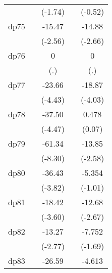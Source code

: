 {\begin{tabular}{l*{4}{c}}
            &                     &     (-1.74)         &                     &     (-0.52)         \\
[1em]
dp75        &                     &      -15.47\sym{*}  &                     &      -14.88\sym{**} \\
            &                     &     (-2.56)         &                     &     (-2.66)         \\
[1em]
dp76        &                     &           0         &                     &           0         \\
            &                     &         (.)         &                     &         (.)         \\
[1em]
dp77        &                     &      -23.66\sym{***}&                     &      -18.87\sym{***}\\
            &                     &     (-4.43)         &                     &     (-4.03)         \\
[1em]
dp78        &                     &      -37.50\sym{***}&                     &       0.478         \\
            &                     &     (-4.47)         &                     &      (0.07)         \\
[1em]
dp79        &                     &      -61.34\sym{***}&                     &      -13.85\sym{**} \\
            &                     &     (-8.30)         &                     &     (-2.58)         \\
[1em]
dp80        &                     &      -36.43\sym{***}&                     &      -5.354         \\
            &                     &     (-3.82)         &                     &     (-1.01)         \\
[1em]
dp81        &                     &      -18.42\sym{***}&                     &      -12.68\sym{**} \\
            &                     &     (-3.60)         &                     &     (-2.67)         \\
[1em]
dp82        &                     &      -13.27\sym{**} &                     &      -7.752         \\
            &                     &     (-2.77)         &                     &     (-1.69)         \\
[1em]
dp83        &                     &      -26.59\sym{***}&                     &      -4.613         \\

\end{tabular}}

